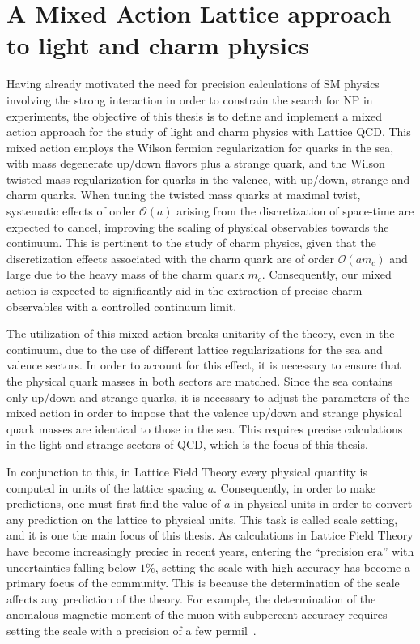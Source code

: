 \section*{A Mixed Action Lattice approach to light and charm physics}

Having already motivated the need for precision calculations of SM physics involving the strong interaction in order to constrain the search for NP in experiments, the objective of this thesis is to define and implement a mixed action approach for the study of light and charm physics with Lattice QCD. This mixed action employs the Wilson fermion regularization for quarks in the sea, with mass degenerate up/down flavors plus a strange quark, and the Wilson twisted mass regularization for quarks in the valence, with up/down, strange and charm quarks. When tuning the twisted mass quarks at maximal twist, systematic effects of order $\mathcal{O}(a)$ arising from the discretization of space-time are expected to cancel, improving the scaling of physical observables towards the continuum. This is pertinent to the study of charm physics, given that the discretization effects associated with the charm quark are of order $\mathcal{O}(am_c)$ and large due to the heavy mass of the charm quark $m_c$. Consequently, our mixed action is expected to significantly aid in the extraction of precise charm observables with a controlled continuum limit.

The utilization of this mixed action breaks unitarity of the theory, even in the continuum, due to the use of different lattice regularizations for the sea and valence sectors. In order to account for this effect, it is necessary to ensure that the physical quark masses in both sectors are matched. Since the sea contains only up/down and strange quarks, it is necessary to adjust the parameters of the mixed action in order to impose that the valence up/down and strange physical quark masses are identical to those in the sea. This requires precise calculations in the light and strange sectors of QCD, which is the focus of this thesis.

In conjunction to this, in Lattice Field Theory every physical quantity is computed in units of the lattice spacing $a$. Consequently, in order to make predictions, one must first find the value of $a$ in physical units in order to convert any prediction on the lattice to physical units. This task is called scale setting, and it is one the main focus of this thesis. As calculations in Lattice Field Theory have become increasingly precise in recent years, entering the ``precision era'' with uncertainties falling below $1\%$, setting the scale with high accuracy has become a primary focus of the community. This is because the determination of the scale affects any prediction of the theory. For example, the determination of the anomalous magnetic moment of the muon with subpercent accuracy requires setting the scale with a precision of a few permil~\citep{Borsanyi:2020mff}.

